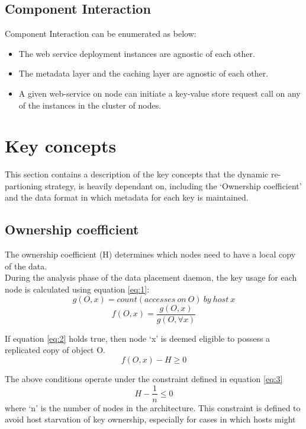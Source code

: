 \documentclass{sig-alternate}
\begin{document}
\subsection{Component Interaction}
Component Interaction can be enumerated as below:
\begin{itemize}
	\item The web service deployment instances are agnostic of each other.
	\item The metadata layer and the caching layer are agnostic of each other.
	\item A given web-service on node can initiate a key-value store request call on any of the instances in the cluster of nodes.
\end{itemize}


\section{Key concepts}
This section contains a description of the key concepts that the dynamic re-partioning strategy, is heavily dependant on, including the `Ownership coefficient' and the data format in which metadata for each key is maintained.

\subsection{Ownership coefficient}
The ownership coefficient (H) determines which nodes need to have a local copy of the data.\\

During the analysis phase of the data placement daemon, the key usage for each node is calculated using equation \ref{eq:1}:
\begin{equation*}g(O, x) = count(accesses\ on\ O)\ by\ host\ x \end{equation*}
\begin{equation} \label{eq:1} f(O,x) = \frac{g(O, x)}{g(O, \forall x)} \end{equation}

If equation \ref{eq:2} holds true, then node `x' is deemed eligible to possess a replicated copy of object O.
\begin{equation} \label{eq:2} f(O, x) - H \geq 0 \end{equation}

The above conditions operate under the constraint defined in equation \ref{eq:3}
\begin{equation} \label{eq:3} H - \frac{1}{n} \leq 0 \end{equation}
where `n' is the number of nodes in the architecture. This constraint is defined to avoid host starvation of key ownership, especially for cases in which hosts might 
\end{document}
